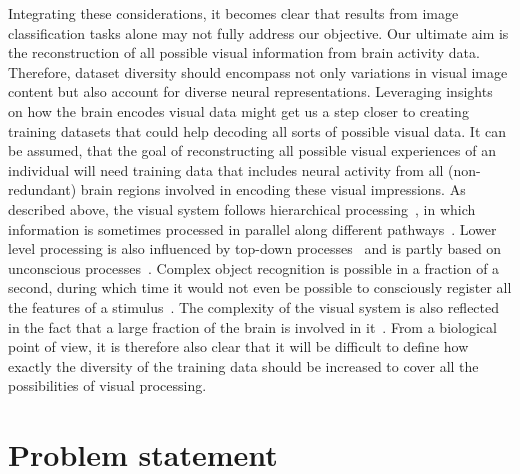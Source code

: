 Integrating these considerations, it becomes clear that results from image classification tasks alone may not fully address our objective. Our ultimate aim is the reconstruction of all possible visual information from brain activity data. Therefore, dataset diversity should encompass not only variations in visual image content but also account for diverse neural representations. Leveraging insights on how the brain encodes visual data might get us a step closer to creating training datasets that could help decoding all sorts of possible visual data. It can be assumed, that the goal of reconstructing all possible visual experiences of an individual will need training data that includes neural activity from all (non-redundant) brain regions involved in encoding these visual impressions. As described above, the visual system follows hierarchical processing~\cite{grill-spectorHUMANVISUALCORTEX2004,horikawaGenericDecodingSeen2017,kamitaniDecodingVisualSubjective2005}, in which information is sometimes processed in parallel along different pathways~\cite{ungerleiderWhatWhereHuman1994,kravitzNewNeuralFramework2011}. Lower level processing is also influenced by top-down processes~\cite{barTopdownFacilitationVisual2006,chengReconstructingVisualIllusory2023} and is partly based on unconscious processes~\cite{kravitzNewNeuralFramework2011}. Complex object recognition is possible in a fraction of a second, during which time it would not even be possible to consciously register all the features of a stimulus~\cite{dicarloHowDoesBrain2012}. The complexity of the visual system is also reflected in the fact that a large fraction of the brain is involved in it~\cite{fellemanDistributedHierarchicalProcessing1991a}. From a biological point of view, it is therefore also clear that it will be difficult to define how exactly the diversity of the training data should be increased to cover all the possibilities of visual processing.


\section{Problem statement}

